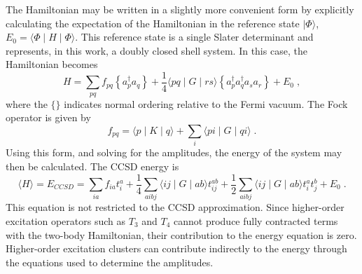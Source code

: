 \documentclass{article}
\begin{document}
The Hamiltonian may be written in a slightly more convenient
form by explicitly calculating the expectation of the Hamiltonian in the
reference state $\mid\Phi\rangle$,
$E_0=\langle\Phi\mid H \mid \Phi\rangle$. This reference state is a single
Slater determinant and represents, in this work, a doubly closed shell system.
In this case, the Hamiltonian becomes
\begin{equation}
H=\sum_{pq}f_{pq}\left\{a^\dagger_p a_q\right\} +
\frac{1}{4}\langle pq \mid G\mid rs \rangle \left\{a^\dagger_p a^\dagger_q
a_s a_r\right\} + E_0 \;,
\end{equation}
where the $\{\}$ indicates normal ordering relative to the Fermi vacuum.
The Fock operator is given by
\begin{equation}
f_{pq}=\langle p\mid K\mid q\rangle + 
\sum_{i}\langle pi \mid G\mid qi \rangle\;.
\end{equation}
Using this form, and solving for the 
amplitudes, the energy of the system may then be calculated. The CCSD
energy is 
\begin{equation}
\langle H \rangle = E_{CCSD}=\sum_{ia}f_{ia}t^a_i 
+\frac{1}{4}\sum_{aibj}\langle ij \mid G\mid ab\rangle t^{ab}_{ij}
+\frac{1}{2}\sum_{aibj}\langle ij \mid G\mid ab\rangle t^a_i t^b_j +E_0\;.
\label{energy_eqn}
\end{equation}
This equation is not restricted to the CCSD approximation. Since 
higher-order excitation operators such as $T_3$ and $T_4$ cannot 
produce fully contracted terms with the two-body Hamiltonian, 
their contribution
to the energy equation is zero. Higher-order excitation clusters can 
contribute indirectly to the energy through the equations used to 
determine the amplitudes. 
\end{document}
